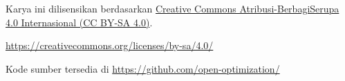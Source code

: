 \bigskip

Karya ini dilisensikan berdasarkan
\href{https://creativecommons.org/licenses/by-sa/4.0/}{Creative Commons
Atribusi-BerbagiSerupa 4.0 Internasional (CC BY-SA 4.0)}.

\bigskip

\begin{center}
\url{https://creativecommons.org/licenses/by-sa/4.0/}
\end{center}

\vfill

\begin{center}
{\small Kode sumber tersedia di \url{https://github.com/open-optimization/}}
\end{center}

\vspace{1cm}

\newpage

%
